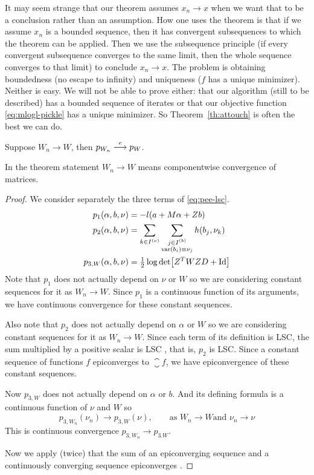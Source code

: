 It may seem strange that our theorem assumes $x_n \to x$ when we want
that to be a conclusion rather than an assumption.  How one uses the
theorem is that if we assume $x_n$ is a bounded sequence, then it has
convergent subsequences to which the theorem can be applied.  Then
we use the subsequence principle (if every convergent subsequence converges
to the same limit, then the whole sequence converges to that limit) to
conclude $x_n \to x$.  The problem is obtaining boundedness (no escape
to infinity) and uniqueness ($f$ has a unique minimizer).  Neither is
easy.  We will not be able to prove either: that our algorithm (still
to be described) has a bounded sequence of iterates or that our objective
function \eqref{eq:mlogl-pickle} has a unique minimizer.
So Theorem~\ref{th:attouch} is often the best we can do.

\begin{theorem} \label{th:pee-epi}
Suppose $W_n \to W$, then $p_{W_n} \stackrel{e}{\longrightarrow} p_{W}$.
\end{theorem}
In the theorem statement $W_n \to W$ means
componentwise convergence of matrices.
\begin{proof}
We consider separately the three terms of \eqref{eq:pee-lsc}.
\begin{align*}
   p_1(\alpha, b, \nu)
   & =
   - l(a + M \alpha + Z b)
   \\
   p_2(\alpha, b, \nu)
   & =
   \sum_{k \in I^{(\nu)}}
   \sum_{\substack{j \in I^{(b)} \\ \operatorname{var}(b_i) \equiv \nu_j}}
   h(b_j, \nu_k)
   \\
   p_{3, W}(\alpha, b, \nu)
   & =
   \tfrac{1}{2} \log \det \bigl[ Z^T W Z D + \text{Id} \bigr]
\end{align*}
Note that $p_1$ does not actually depend on $\nu$ or $W$ so we are
considering constant sequences for it as $W_n \to W$.  Since $p_1$
is a continuous function of its arguments, we have continuous convergence
for these constant sequences.

Also note that $p_2$ does not actually depend on $\alpha$ or $W$ so we are
considering constant sequences for it as $W_n \to W$.  Since each term of
its definition is LSC, the sum multiplied by a positive scalar is LSC
\citet[Theorem~1.39]{rockafellar-wets}, that is, $p_2$ is LSC.
Since a constant sequence of functions $f$ epiconverges to $\closure f$,
we have epiconvergence of these constant sequences.

Now $p_{3, W}$ does not actually depend on $\alpha$ or $b$.  And its
defining formula is a continuous function of $\nu$ and $W$ so
$$
   p_{3, W_n}(\nu_n) \to p_{3, W}(\nu), \qquad \text{as $W_n \to W$
   and $\nu_n \to \nu$}
$$
This is continuous convergence $p_{3, W_n} \to p_{3. W}$.

Now we apply (twice) that the sum of an epiconverging sequence
and a continuously converging sequence epiconverges
\citep[Theorem~7.46 (b)]{rockafellar-wets}.
\end{proof}

